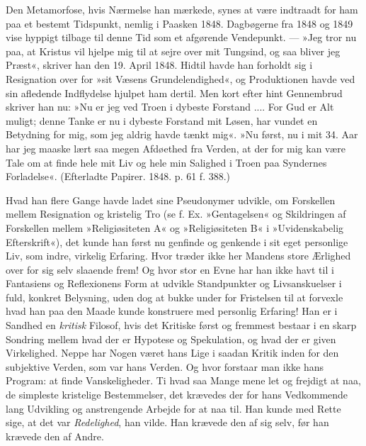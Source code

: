 \documentclass[12pt,a4paper,openany]{book}
\newcommand{\opage}[1]{\marginnote{\footnotesize\textit{[#1]}}}
\begin{document}
Den Metamorfose, hvis Nærmelse han mærkede,
synes at være indtraadt for ham paa et bestemt Tidspunkt,
nemlig i Paasken 1848. Dagbøgerne fra 1848 og
1849 vise hyppigt tilbage til denne Tid som et afgørende
Vendepunkt. --- »Jeg tror nu paa, at Kristus vil hjelpe
mig til at sejre over mit Tungsind, og saa bliver jeg
Præst«, skriver han den 19. April 1848. Hidtil havde
han forholdt sig i Resignation over for »sit Væsens Grundelendighed«,
og Produktionen havde ved sin afledende
Indflydelse hjulpet ham dertil. Men kort efter hint Gennembrud
skriver han nu: »Nu er jeg ved Troen i dybeste
Forstand .... For Gud er Alt muligt; denne Tanke er
nu i dybeste Forstand mit Løsen, har vundet en Betydning
for mig, som jeg aldrig havde tænkt mig«. »Nu
\opage{129}først, nu i mit 34. Aar har jeg maaske lært saa megen
Afdøethed fra Verden, at der for mig kan være Tale om
at finde hele mit Liv og hele min Salighed i Troen paa
Syndernes Forladelse«. (Efterladte Papirer. 1848. p. 61 f.
388.)

Hvad han flere Gange havde ladet sine Pseudonymer
udvikle, om Forskellen mellem Resignation og kristelig
Tro (se f. Ex. »Gentagelsen« og Skildringen af Forskellen
mellem »Religiøsiteten A« og »Religiøsiteten B« i »Uvidenskabelig
Efterskrift«), det kunde han først nu genfinde
og genkende i sit eget personlige Liv, som indre, virkelig
Erfaring. Hvor træder ikke her Mandens store Ærlighed
over for sig selv slaaende frem! Og hvor stor en Evne
har han ikke havt til i Fantasiens og Reflexionens Form
at udvikle Standpunkter og Livsanskuelser i fuld, konkret
Belysning, uden dog at bukke under for Fristelsen
til at forvexle hvad han paa den Maade kunde konstruere
med personlig Erfaring! Han er i Sandhed en \textit{kritisk}
Filosof, hvis det Kritiske først og fremmest bestaar i en
skarp Sondring mellem hvad der er Hypotese og Spekulation,
og hvad der er given Virkelighed. Neppe har
Nogen været hans Lige i saadan Kritik inden for den
subjektive Verden, som var hans Verden. Og hvor forstaar
man ikke hans Program: at finde Vanskeligheder.
Ti hvad saa Mange mene let og frejdigt at naa, de simpleste
kristelige Bestemmelser, det krævedes der for hans
Vedkommende lang Udvikling og anstrengende Arbejde
for at naa til. Han kunde med Rette sige, at det var
\textit{Redelighed}, han vilde. Han krævede den af sig selv, før
han krævede den af Andre.
\end{document}
